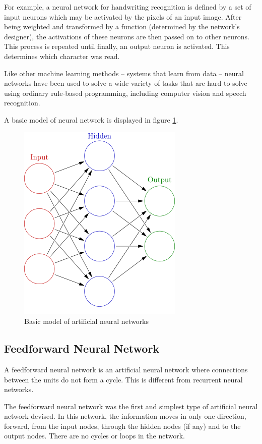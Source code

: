 \documentclass[14pt,a4paper]{extarticle}
\begin{document}
For example, a neural network for handwriting recognition is defined by a set of input neurons which may be activated by the pixels of an input image. After being weighted and transformed by a function (determined by the network's designer), the activations of these neurons are then passed on to other neurons. This process is repeated until finally, an output neuron is activated. This determines which character was read.

Like other machine learning methods – systems that learn from data – neural networks have been used to solve a wide variety of tasks that are hard to solve using ordinary rule-based programming, including computer vision and speech recognition.

A basic model of neural network is displayed in figure \ref{fig:neural_net_model}.

		\begin{figure}[H]
			\includegraphics[width=.4\textwidth, center]{neural_net_example.png}
			\caption{Basic model of artificial neural networks}
			\label{fig:neural_net_model}
		\end{figure}
	
	\subsection{Feedforward Neural Network}
	
	A feedforward neural network is an artificial neural network where connections between the units do not form a cycle. This is different from recurrent neural networks.

The feedforward neural network was the first and simplest type of artificial neural network devised. In this network, the information moves in only one direction, forward, from the input nodes, through the hidden nodes (if any) and to the output nodes. There are no cycles or loops in the network.
\end{document}
